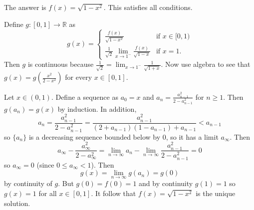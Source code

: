 The answer is $f(x)=\sqrt{1-x^2}$. This satisfies all conditions.

Define $g:[0,1]\to\mathbb{R}$ as
\[
	g(x)=
	\begin{cases}
		\frac{f(x)}{\sqrt{1-x^2}} & \text{if }x\in[0,1) \\
		\frac{1}{\sqrt{2}}\lim_{x\to1^-}\frac{f(x)}{\sqrt{1-x}} & \text{if }x=1.
	\end{cases}
\]
Then $g$ is continuous because $\frac{1}{\sqrt{2}}=\lim_{x\to1^-}\frac{1}{\sqrt{1+x}}$. Now use algebra to see that $g(x)=g\left(\frac{x^2}{2-x^2}\right)$ for every $x\in[0,1]$.

Let $x\in(0,1)$. Define a sequence as $a_0=x$ and $a_n=\frac{a_{n-1}^2}{2-a_{n-1}^2}$ for $n\geq1$. Then $g(a_n)=g(x)$ by induction. In addition,
\[
	a_n=\frac{a_{n-1}^2}{2-a_{n-1}^2}=\frac{a_{n-1}^2}{(2+a_{n-1})(1-a_{n-1})+a_{n-1}}<a_{n-1}
\]
so $\{a_n\}$ is a decreasing sequence bounded below by $0$, so it has a limit $a_\infty$. Then
\[
	a_\infty-\frac{a_\infty^2}{2-a_\infty^2}=\lim_{n\to\infty}a_n-\lim_{n\to\infty}\frac{a_{n-1}^2}{2-a_{n-1}^2}=0
\]
so $a_\infty=0$ (since $0\leq a_\infty<1$). Then
\[
	g(x)=\lim_{n\to\infty}g(a_n)=g(0)
\]
by continuity of $g$. But $g(0)=f(0)=1$ and by continuity $g(1)=1$ so $g(x)=1$ for all $x\in[0,1]$. It follow that $f(x)=\sqrt{1-x^2}$ is the unique solution.